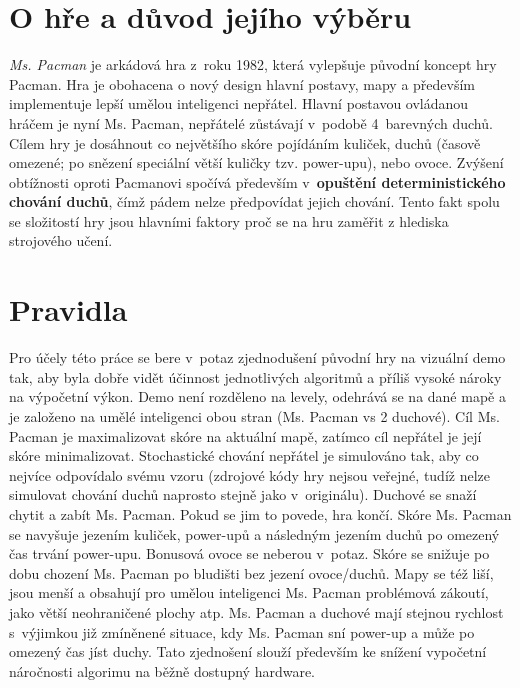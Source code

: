 \section{O hře a důvod jejího výběru}
\textit{Ms. Pacman} je arkádová hra z roku 1982, která vylepšuje původní koncept hry Pacman. Hra je obohacena o nový design hlavní postavy, mapy a především implementuje lepší umělou inteligenci nepřátel. Hlavní postavou ovládanou hráčem je nyní Ms. Pacman, nepřátelé zůstávají v podobě 4 barevných duchů. Cílem hry je dosáhnout co největšího skóre pojídáním kuliček, duchů (časově omezené; po snězení speciální větší kuličky tzv. power-upu), nebo ovoce.
Zvýšení obtížnosti oproti Pacmanovi spočívá především v \textbf{opuštění deterministického chování duchů}, čímž pádem nelze předpovídat jejich chování. Tento fakt spolu se složitostí hry jsou hlavními faktory proč se na hru zaměřit z hlediska strojového učení.
\section{Pravidla}
Pro účely této práce se bere v potaz zjednodušení původní hry na vizuální demo tak, aby byla dobře vidět účinnost jednotlivých algoritmů a příliš vysoké nároky na výpočetní výkon. Demo není rozděleno na levely, odehrává se na dané mapě a je založeno na umělé inteligenci obou stran (Ms. Pacman vs 2 duchové). Cíl Ms. Pacman je maximalizovat skóre na aktuální mapě, zatímco cíl nepřátel je její skóre minimalizovat. Stochastické chování nepřátel je simulováno tak, aby co nejvíce odpovídalo svému vzoru (zdrojové kódy hry nejsou veřejné, tudíž nelze simulovat chování duchů naprosto stejně jako v originálu). Duchové se snaží chytit a zabít Ms. Pacman. Pokud se jim to povede, hra končí. Skóre Ms. Pacman se navyšuje jezením kuliček, power-upů a následným jezením duchů po omezený čas trvání power-upu. Bonusová ovoce se neberou v potaz. Skóre se snižuje po dobu chození Ms. Pacman po bludišti bez jezení ovoce/duchů. Mapy se též liší, jsou menší a obsahují pro umělou inteligenci Ms. Pacman problémová zákoutí, jako větší neohraničené plochy atp. Ms. Pacman a duchové mají stejnou rychlost s výjimkou již zmíněnené situace, kdy Ms. Pacman sní power-up a může po omezený čas jíst duchy. Tato zjednošení slouží především ke snížení vypočetní náročnosti algorimu na běžně dostupný hardware.
